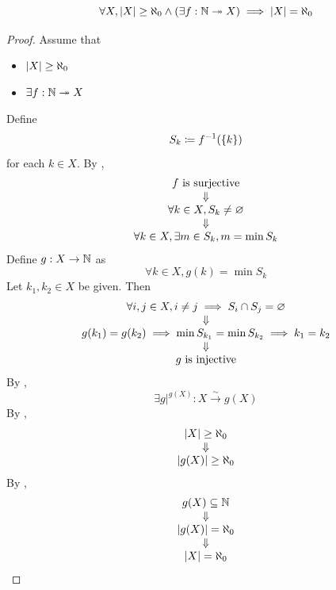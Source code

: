 \bigskip

\begin{theorem} \label{an:thm:surjection-from-N}
    \[
    \forall X, \abs*{X} \geq \aleph_{0} \land \paren*{\exists f: \N \twoheadrightarrow X} \implies \abs*{X} = \aleph_{0}
    \]
\end{theorem}

\begin{proof}
    Assume that
    \begin{itemize}
        \item $\abs*{X} \geq \aleph_{0}$
        \item $\exists f: \N \twoheadrightarrow X$
    \end{itemize}
    Define
    \[
    S_{k} \coloneqq f^{-1}(\set*{k})
    \]
    for each $k \in X$. By ,
    \[
    \begin{array}{c}
        f \text{ is surjective} \\
        \Downarrow \\
        \forall k \in X, S_{k} \neq \vnot \\
        \Downarrow \\
        \forall k \in X, \exists m \in S_{k}, m = \min S_{k} \\
    \end{array}
    \]
    Define $g: X \to \N$ as
    \[
    \forall k \in X, g(k) = \min S_{k}
    \]
    Let $k_{1}, k_{2} \in X$ be given. Then
    \[
    \begin{array}{c}
        \forall i,j \in X, i \neq j \implies S_{i} \cap S_{j} = \vnot \\
        \Downarrow \\
        g(k_{1}) = g(k_{2}) \implies \min S_{k_{1}} = \min S_{k_{2}} \implies k_{1} = k_{2} \\
        \Downarrow \\
        g \text{ is injective}
    \end{array}
    \]
    By ,
    \[
    \exists g|^{g(X)}: X \xrightarrow{\sim} g(X)
    \]
    By ,
    \[
    \begin{array}{c}
        \abs*{X} \geq \aleph_{0} \\
        \Downarrow \\
        \abs*{g(X)} \geq \aleph_{0} \\
    \end{array}
    \]
    By ,
    \[
    \begin{array}{c}
        g(X) \subseteq \N \\
        \Downarrow \\
        \abs*{g(X)} = \aleph_{0} \\
        \Downarrow \\
        \abs*{X} = \aleph_{0}
    \end{array}
    \]
\end{proof}
